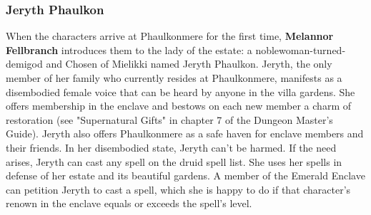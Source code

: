 \documentclass[10pt,a4paper,twoside,twocolumn,openany,nodeprecatedcode]{dndbook}
\begin{document}
\subsubsection{Jeryth Phaulkon}
When the characters arrive at Phaulkonmere for the first time, \textbf{Melannor Fellbranch} introduces them to the lady of the estate: a noblewoman-turned-demigod and Chosen of Mielikki named Jeryth Phaulkon. Jeryth, the only member of her family who currently resides at Phaulkonmere, manifests as a disembodied female voice that can be heard by anyone in the villa gardens. She offers membership in the enclave and bestows on each new member a charm of restoration (see "Supernatural Gifts" in chapter 7 of the Dungeon Master's Guide). Jeryth also offers Phaulkonmere as a safe haven for enclave members and their friends.
In her disembodied state, Jeryth can't be harmed. If the need arises, Jeryth can cast any spell on the druid spell list. She uses her spells in defense of her estate and its beautiful gardens. A member of the Emerald Enclave can petition Jeryth to cast a spell, which she is happy to do if that character's renown in the enclave equals or exceeds the spell's level.
\end{document}

